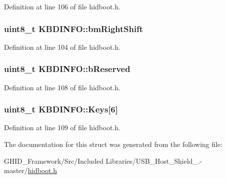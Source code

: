 \-Definition at line 106 of file hidboot.\-h.

\hypertarget{struct_k_b_d_i_n_f_o_acf82b510a3676bf60c122ad500c216c9}{
\subsubsection[{bm\-Right\-Shift}]{\setlength{\rightskip}{0pt plus 5cm}uint8\-\_\-t {\bf \-K\-B\-D\-I\-N\-F\-O\-::bm\-Right\-Shift}}}\label{struct_k_b_d_i_n_f_o_acf82b510a3676bf60c122ad500c216c9}


\-Definition at line 104 of file hidboot.\-h.

\hypertarget{struct_k_b_d_i_n_f_o_a91061aae6b2f52c94b1ed734def585a0}{
\subsubsection[{b\-Reserved}]{\setlength{\rightskip}{0pt plus 5cm}uint8\-\_\-t {\bf \-K\-B\-D\-I\-N\-F\-O\-::b\-Reserved}}}\label{struct_k_b_d_i_n_f_o_a91061aae6b2f52c94b1ed734def585a0}


\-Definition at line 108 of file hidboot.\-h.

\hypertarget{struct_k_b_d_i_n_f_o_a942e4eb5551fbe8958e858057391dd2d}{
\subsubsection[{\-Keys}]{\setlength{\rightskip}{0pt plus 5cm}uint8\-\_\-t {\bf \-K\-B\-D\-I\-N\-F\-O\-::\-Keys}\mbox{[}6\mbox{]}}}\label{struct_k_b_d_i_n_f_o_a942e4eb5551fbe8958e858057391dd2d}


\-Definition at line 109 of file hidboot.\-h.



\-The documentation for this struct was generated from the following file\-:\begin{DoxyCompactItemize}
\item 
\-G\-H\-I\-D\-\_\-\-Framework/\-Src/\-Included Libraries/\-U\-S\-B\-\_\-\-Host\-\_\-\-Shield\-\_.-\/master/\hyperlink{hidboot_8h}{hidboot.\-h}\end{DoxyCompactItemize}
